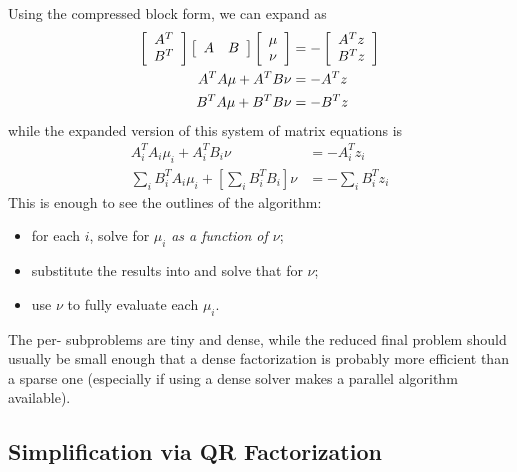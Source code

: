 Using the compressed block form, we can expand  as
\begin{align}
    \left[
        \begin{array}{ c }
            A^T \\
            B^T
        \end{array}
    \right]
    \left[
        \begin{array}{ c c }
            A & B
        \end{array}
    \right]
    \left[
        \begin{array}{ c }
            \mu \\
            \nu
        \end{array}
    \right]
    &=
    -\left[
        \begin{array}{ c }
            A^T z \\
            B^T z
        \end{array}
    \right] \\
    A^T A \mu + A^T B \nu &= -A^T z \\
    B^T A \mu + B^T B \nu &= -B^T z
\end{align}
while the expanded version of this system of matrix equations is
\begin{align}
    A_i^T A_i \mu_i + A_i^T B_i \nu &= -A_i^T z_i \label{eq:vp_star_subproblem} \\
    \sum_i B_i^T A_i \mu_i + \left[\sum_i B_i^T B_i\right]\nu &= -\sum_i B_i^T z_i \label{eq:vp_reduced_problem}
\end{align}
This is enough to see the outlines of the algorithm:
\begin{itemize}
    \item for each  $i$, solve  for $\mu_i$ \emph{as a function of $\nu$};
    \item substitute the results into  and solve that for $\nu$;
    \item use $\nu$ to fully evaluate each $\mu_i$.
\end{itemize}
The per- subproblems are tiny and dense, while the reduced final problem should usually be small enough that a dense factorization is probably more efficient than a sparse one (especially if using a dense solver makes a parallel algorithm available).

\subsection{Simplification via QR Factorization}

